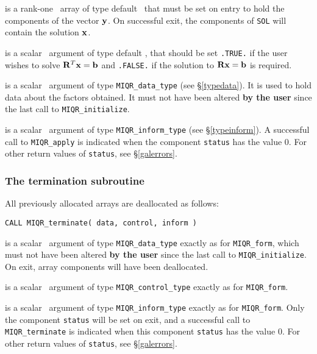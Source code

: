 \documentclass{galahad}
\newcommand{\packagename}{MIQR}
\begin{document}
\vspace*{-3mm}
\begin{description}
 is a rank-one  \intentinout\ array of type default \real\
that must be set on entry to hold the components of the vector ${\mathbf{y}}$.
On successful exit, the components of {\tt SOL} will contain the solution
${\mathbf{x}}$.

 is a scalar \intentin\ argument of type default \logical,
that should be set {\tt .TRUE.} if the user wishes to solve
${\mathbf{R}}^T {\mathbf{x}} = {\mathbf{b}}$ and {\tt .FALSE.} if the solution to
${\mathbf{R}} {\mathbf{x}} = {\mathbf{b}}$ is required.

 is a scalar \intentinout\ argument of type
{\tt \packagename\_data\_type}
(see \S\ref{typedata}). It is used to hold data about the factors obtained.
It must not have been altered {\bf by the user} since the last call to
{\tt \packagename\_initialize}.

 is a scalar \intentout\ argument of type
{\tt \packagename\_inform\_type}
(see \S\ref{typeinform}). A successful call to {\tt \packagename\_apply}
is indicated when the  component {\tt status} has the value 0.
For other return values of {\tt status}, see \S\ref{galerrors}.

\end{description}


\subsubsection{The  termination subroutine}
All previously allocated arrays are deallocated as follows:
\vspace*{1mm}

\hspace{8mm}
{\tt CALL \packagename\_terminate( data, control, inform )}

\begin{description}

 is a scalar \intentinout\ argument of type
{\tt \packagename\_data\_type}
exactly as for
{\tt \packagename\_form},
which must not have been altered {\bf by the user} since the last call to
{\tt \packagename\_initialize}.
On exit, array components will have been deallocated.

 is a scalar \intentin\ argument of type
{\tt \packagename\_control\_type}
exactly as for
{\tt \packagename\_form}.

 is a scalar \intentout\ argument of type
{\tt \packagename\_inform\_type}
exactly as for
{\tt \packagename\_form}.
Only the component {\tt status} will be set on exit, and a
successful call to
{\tt \packagename\_terminate}
is indicated when this  component {\tt status} has the value 0.
For other return values of {\tt status}, see \S\ref{galerrors}.

\end{description}
\end{document}
